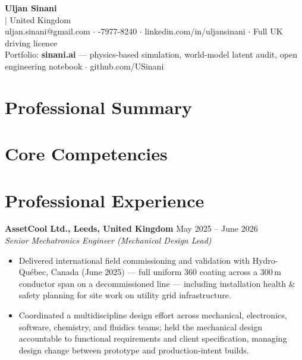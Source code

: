 
\begin{center}
  {\LARGE\bfseries Uljan Sinani}\\[2pt]
  {\large \Headline{} $|$ United Kingdom}\\[3pt]
  uljan.sinani@gmail.com \; $\cdot$ -7977-8240 \; $\cdot$ \; linkedin.com/in/uljansinani \; $\cdot$ \; Full UK driving licence\\[2pt]
  {\small Portfolio: \textbf{sinani.ai} — physics-based simulation, world-model latent audit, open engineering notebook \; $\cdot$ \; github.com/USinani}
\end{center}

\section*{Professional Summary}
\Summary

\section*{Core Competencies}
\Competencies

\section*{Professional Experience}

\noindent\textbf{AssetCool Ltd., Leeds, United Kingdom} \hfill May 2025 -- June 2026\\
\textit{Senior Mechatronics Engineer (Mechanical Design Lead)}
\begin{itemize}
  \AssetCoolBullets
  \item Delivered international field commissioning and validation with Hydro-Qu\'ebec, Canada (June 2025) --- full uniform 360\textdegree{} coating across a 300\,m conductor span on a decommissioned line --- including installation health \& safety planning for site work on utility grid infrastructure.
  \item Coordinated a multidiscipline design effort across mechanical, electronics, software, chemistry, and fluidics teams; held the mechanical design accountable to functional requirements and client specification, managing design change between prototype and production-intent builds.
\end{itemize}

